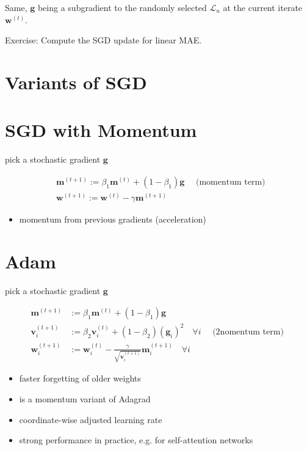 \documentclass[10pt]{article}
\begin{document}
Same, $\mathbf{g}$ being a subgradient to the randomly selected $\mathcal{L}_{n}$ at the current iterate $\mathbf{w}^{(t)}$.

Exercise: Compute the SGD update for linear MAE.

\section*{Variants of SGD}
\section*{SGD with Momentum}
pick a stochastic gradient $\mathbf{g}$

$$
\begin{aligned}
& \mathbf{m}^{(t+1)}:=\beta_{1} \mathbf{m}^{(t)}+\left(1-\beta_{1}\right) \mathbf{g} \quad \text { (momentum term) } \\
& \mathbf{w}^{(t+1)}:=\mathbf{w}^{(t)}-\gamma \mathbf{m}^{(t+1)}
\end{aligned}
$$

\begin{itemize}
  \item momentum from previous gradients (acceleration)
\end{itemize}

\section*{Adam}
pick a stochastic gradient $\mathbf{g}$

$$
\begin{aligned}
\mathbf{m}^{(t+1)} & :=\beta_{1} \mathbf{m}^{(t)}+\left(1-\beta_{1}\right) \mathbf{g} \\
\mathbf{v}_{i}^{(t+1)} & :=\beta_{2} \mathbf{v}_{i}^{(t)}+\left(1-\beta_{2}\right)\left(\mathbf{g}_{i}\right)^{2} \quad \forall i \quad \text { (2nomentum term) } \\
\mathbf{w}_{i}^{(t+1)} & :=\mathbf{w}_{i}^{(t)}-\frac{\gamma}{\sqrt{\mathbf{v}_{i}^{(t+1)}}} \mathbf{m}_{i}^{(t+1)} \quad \forall i
\end{aligned}
$$

\begin{itemize}
  \item faster forgetting of older weights
  \item is a momentum variant of Adagrad
  \item coordinate-wise adjusted learning rate
  \item strong performance in practice, e.g. for self-attention networks
\end{itemize}
\end{document}
